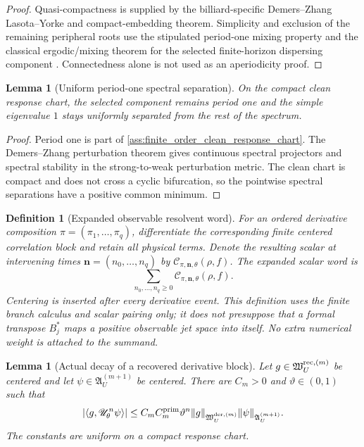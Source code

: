 \documentclass[11pt]{amsart}
\theoremstyle{compactplain}
\newtheorem{lemma}[theorem]{Lemma}
\newtheorem*{lemma*}{Lemma}
\theoremstyle{compactdefinition}
\newtheorem*{definition*}{Definition}
\theoremstyle{compactremark}
\begin{document}
\begin{proof}
Quasi-compactness is supplied by the billiard-specific Demers--Zhang
Lasota--Yorke and compact-embedding theorem.  Simplicity and exclusion of the
remaining peripheral roots use the stipulated period-one mixing property and
the classical ergodic/mixing theorem for the selected finite-horizon
dispersing component
\cite{Sinai1970,chernov2006chaotic,ChernovZhang2009}.  Connectedness alone is
not used as an aperiodicity proof.
\end{proof}

\begin{lemma*}[Uniform period-one spectral separation]
On the compact clean response chart, the selected component remains period
one and the simple eigenvalue \(1\) stays uniformly separated from the rest of
the spectrum.
\end{lemma*}

\begin{proof}
Period one is part of \cref{ass:finite_order_clean_response_chart}.  The
Demers--Zhang perturbation theorem gives continuous spectral projectors and
spectral stability in the strong-to-weak perturbation metric.  The clean chart
is compact and does not cross a cyclic bifurcation, so the pointwise spectral
separations have a positive common minimum.
\end{proof}

\begin{definition*}[Expanded observable resolvent word]
For an ordered derivative composition
\(\pi=(\pi_1,\ldots,\pi_q)\), differentiate the corresponding finite centered
correlation block and retain all physical terms.  Denote the resulting scalar
at intervening times \(\mathbf n=(n_0,\ldots,n_q)\) by
\(\mathcal C_{\pi,\mathbf n,\theta}(\rho,f)\).  The expanded scalar word is
\begin{equation}
\label{eq:expanded_observable_resolvent_word}
  \sum_{n_0,\ldots,n_q\ge0}
  \mathcal C_{\pi,\mathbf n,\theta}(\rho,f).
\end{equation}
Centering is inserted after every derivative event.  This definition uses the
finite branch calculus and scalar pairing only; it does not presuppose that a
formal transpose \(B_j^*\) maps a positive observable jet space into itself.
No extra numerical weight is attached to the summand.
\end{definition*}

\begin{lemma}[Actual decay of a recovered derivative block]
\label{lem:actual_derivative_block_decay}
Let \(g\in\mathfrak W_U^{{\rm rec},(m)}\) be centered and let
\(\psi\in\mathfrak A_U^{(m+1)}\) be centered.  There are \(C_m>0\) and
\(\vartheta\in(0,1)\) such that
\begin{equation}
\label{eq:actual_derivative_block_decay}
  |\langle g,\mathscr U_\theta^n\psi\rangle|
  \le
  C_m C_m^{\rm prim}\vartheta^n
  \|g\|_{\mathfrak W_U^{{\rm der},(m)}}
  \|\psi\|_{\mathfrak A_U^{(m+1)}} .
\end{equation}
The constants are uniform on a compact response chart.
\end{lemma}
\end{document}
